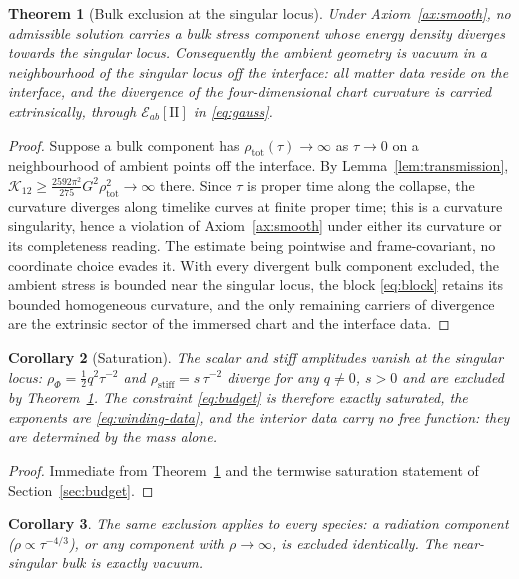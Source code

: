 \documentclass[11pt]{article}
\numberwithin{equation}{section}
\theoremstyle{plain}
\newtheorem{theorem}{Theorem}[section]
\newtheorem{corollary}[theorem]{Corollary}
\theoremstyle{definition}
\theoremstyle{remark}
\newcommand{\Kr}{\mathcal{K}}
\newcommand{\II}{\mathrm{II}}
\newcommand{\Geff}{G}
\begin{document}
\begin{theorem}[Bulk exclusion at the singular locus]
\label{thm:exclusion}
Under Axiom~\ref{ax:smooth}, no admissible solution carries a bulk
stress component whose energy density diverges towards the singular
locus. Consequently the ambient geometry is vacuum in a neighbourhood
of the singular locus off the interface: all matter data reside on the
interface, and the divergence of the four-dimensional chart curvature
is carried extrinsically, through $\mathcal{E}_{ab}[\II]$ in
\eqref{eq:gauss}.
\end{theorem}

\begin{proof}
Suppose a bulk component has
$\rho_{\mathrm{tot}}(\tau) \to \infty$ as $\tau \to 0$ on a
neighbourhood of ambient points off the interface. By
Lemma~\ref{lem:transmission}, $\Kr_{12} \geq
\tfrac{2592\pi^{2}}{275}\Geff^{2}\rho_{\mathrm{tot}}^{2} \to \infty$
there. Since $\tau$ is proper time along the collapse, the curvature
diverges along timelike curves at finite proper time; this is a
curvature singularity, hence a violation of Axiom~\ref{ax:smooth}
under either its curvature or its completeness reading. The estimate
being pointwise and frame-covariant, no coordinate choice evades it.
With every divergent bulk component excluded, the ambient stress is
bounded near the singular locus, the block \eqref{eq:block} retains
its bounded homogeneous curvature, and the only remaining carriers of
divergence are the extrinsic sector of the immersed chart and the
interface data.
\end{proof}

\begin{corollary}[Saturation]\label{cor:saturation}
The scalar and stiff amplitudes vanish at the singular locus:
$\rho_{\Phi} = \tfrac12 q^{2}\tau^{-2}$ and
$\rho_{\mathrm{stiff}} = s\,\tau^{-2}$ diverge for any $q \neq 0$,
$s > 0$ and are excluded by Theorem~\ref{thm:exclusion}. The
constraint \eqref{eq:budget} is therefore exactly saturated, the
exponents are \eqref{eq:winding-data}, and the interior data carry no
free function: they are determined by the mass alone.
\end{corollary}

\begin{proof}
Immediate from Theorem~\ref{thm:exclusion} and the termwise saturation
statement of Section~\ref{sec:budget}.
\end{proof}

\begin{corollary}\label{cor:allspecies}
The same exclusion applies to every species: a radiation component
($\rho \propto \tau^{-4/3}$), or any component with
$\rho \to \infty$, is excluded identically. The near-singular bulk is
exactly vacuum.
\end{corollary}
\end{document}

